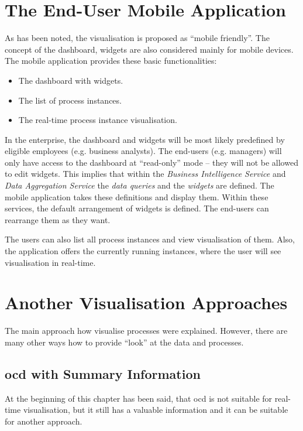 \section{The End-User Mobile Application}
As has been noted, the visualisation is proposed as ``mobile friendly''. The concept of the dashboard, widgets are also considered mainly for mobile devices. The mobile application provides these basic functionalities:

\begin{itemize}
\item The dashboard with widgets.
\item The list of process instances.
\item The real-time process instance visualisation.
\end{itemize}

In the enterprise, the dashboard and widgets will be most likely predefined by eligible employees (e.g. business analysts). The end-users (e.g. managers) will only have access to the dashboard at ``read-only'' mode -- they will not be allowed to edit widgets. This implies that within the \textit{Business Intelligence Service} and \textit{Data Aggregation Service} the \textit{data queries} and the \textit{widgets} are defined. The mobile application takes these definitions and display them. Within these services, the default arrangement of widgets is defined. The end-users can rearrange them as they want.

The users can also list all process instances and view visualisation of them. Also, the application offers the currently running instances, where the user will see visualisation in real-time. 
\section{Another Visualisation Approaches}
The main approach how visualise processes were explained. However, there are many other ways how to provide ``look'' at the data and processes. 
\subsection{\gls{ocd} with Summary Information}
At the beginning of this chapter has been said, that \gls{ocd} is not suitable for real-time visualisation, but it still has a valuable information and it can be suitable for another approach. 

